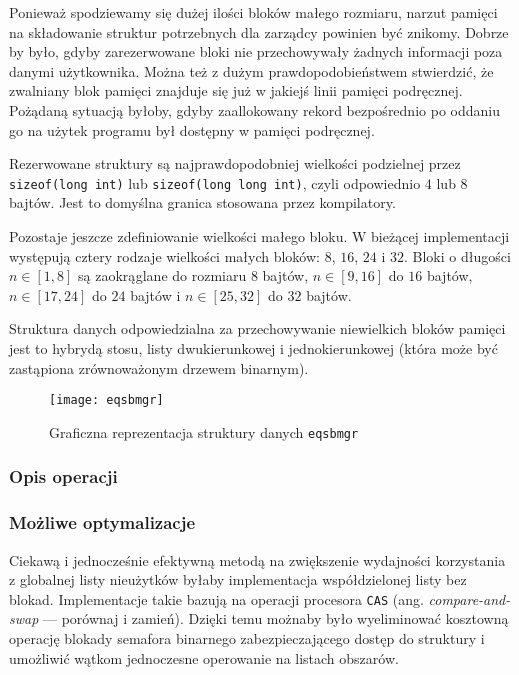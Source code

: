 \documentclass[12pt,a4paper,titlepage,twoside]{mwart}
\begin{document}
Ponieważ spodziewamy się dużej ilości bloków małego rozmiaru, narzut pamięci na
składowanie struktur potrzebnych dla zarządcy powinien być znikomy. Dobrze by
było, gdyby zarezerwowane bloki nie przechowywały żadnych informacji poza
danymi użytkownika. Można też z dużym prawdopodobieństwem stwierdzić, że
zwalniany blok pamięci znajduje się już w jakiejś linii pamięci podręcznej.
Pożądaną sytuacją byłoby, gdyby zaallokowany rekord bezpośrednio po oddaniu go
na użytek programu był dostępny w pamięci podręcznej.

Rezerwowane struktury są najprawdopodobniej wielkości podzielnej przez
\texttt{sizeof(long int)} lub \texttt{sizeof(long long int)}, czyli odpowiednio
$4$ lub $8$ bajtów. Jest to domyślna granica stosowana przez kompilatory.

Pozostaje jeszcze zdefiniowanie wielkości małego bloku. W bieżącej implementacji
występują cztery rodzaje wielkości małych bloków: $8$, $16$, $24$ i $32$. Bloki o
długości $n \in [1,8]$ są zaokrąglane do rozmiaru $8$ bajtów, $n \in [9,16]$ do
$16$ bajtów, $n \in [17,24]$ do $24$ bajtów i $n \in [25,32]$ do $32$ bajtów.

Struktura danych odpowiedzialna za przechowywanie niewielkich bloków pamięci
jest to hybrydą stosu, listy dwukierunkowej i jednokierunkowej (która może być
zastąpiona zrównoważonym drzewem binarnym).

\begin{figure}[h]
\centering
\texttt{[image: eqsbmgr]}
\caption{Graficzna reprezentacja struktury danych \texttt{eqsbmgr}}
\end{figure}

\subsubsection{Opis operacji}

\subsubsection{Możliwe optymalizacje}

Ciekawą i jednocześnie efektywną metodą na zwiększenie wydajności korzystania z
globalnej listy nieużytków byłaby implementacja współdzielonej listy bez
blokad. Implementacje takie bazują na operacji procesora \verb+CAS+ (ang.
\textit{compare-and-swap} --- porównaj i zamień). Dzięki temu możnaby było
wyeliminować kosztowną operację blokady semafora binarnego zabezpieczającego
dostęp do struktury i umożliwić wątkom jednoczesne operowanie na listach
obszarów.
\end{document}
